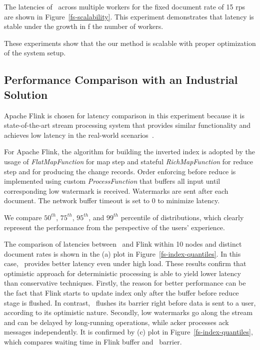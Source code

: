 The latencies of \FlameStream\ across multiple workers for the fixed document rate of 15 rps are shown in Figure~\ref{fs-scalability}. 
This experiment demonstrates that latency is stable  under  the growth in f the number of workers.

These experiments show that  the our method is scalable with proper  optimization of  the system setup.

\subsection{Performance Comparison with an Industrial Solution}

Apache Flink is chosen for latency comparison in this experiment  because it is state-of-the-art stream processing system that provides similar functionality 
and achieves low latency in the real-world scenarios~\cite{S7530084}. 

For Apache Flink, the algorithm for building the inverted index is 
adopted 
by the usage of {\it FlatMapFunction} for map step and stateful {\it RichMapFunction} for reduce step and for producing the change records. 
Order enforcing before reduce is implemented using custom {\it ProcessFunction} that buffers all input until corresponding low watermark is received. Watermarks are sent after each document. The network buffer timeout is set to 0 to minimize latency.

We compare $50^{th}$, $75^{th}$, $95^{th}$, and $99^{th}$ percentile of distributions, which clearly represent the performance from the perspective of the users' experience.

The comparison of latencies between \FlameStream\ and Flink within 10 nodes and distinct document rates is shown in the (a) plot in Figure~\ref{fs-index-quantiles}. 
In this case, \FlameStream\ provides better  latency even under high load. 
These results confirm that optimistic approach for deterministic processing is able to yield  lower  latency than conservative techniques. 
Firstly, the reason for better performance can be the fact that Flink starts to update index only after the buffer before reduce stage is flushed. 
In contrast, \FlameStream\ flushes its barrier right before data is sent to a user, according to its optimistic nature. 
Secondly, low watermarks go along the stream and can be delayed by long-running operations, while acker processes ack messages independently. It is confirmed by (c) plot in Figure~\ref{fs-index-quantiles}, which compares  waiting time in Flink buffer and \FlameStream\ barrier.

